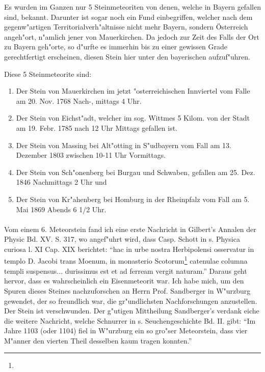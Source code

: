 \documentclass[a4paper, 11pt, oneside]{article}
\begin{document}
Es wurden im Ganzen nur 5 Steinmeteoriten von denen, welche in Bayern gefallen sind, bekannt. Darunter ist sogar noch ein Fund einbegriffen, welcher nach dem gegenw"artigen Territorialverh"altnisse nicht mehr Bayern, sondern Österreich angeh"ort, n"amlich jener von Mauerkirchen. Da jedoch zur Zeit des Falls der Ort zu Bayern geh"orte, so d"urfte es immerhin bis zu einer gewissen Grade gerechtfertigt erscheinen, diesen Stein hier unter den bayerischen aufzuf"uhren.

Diese 5 Steinmeteorite sind:
\begin{enumerate}
    \item Der Stein von Mauerkirchen im jetzt "osterreichischen Innviertel vom Falle am 20. Nov. 1768 Nach-, mittags 4 Uhr.
    \item Der Stein von Eichst"adt, welcher im sog. Wittmes 5 Kilom. von der Stadt am 19. Febr. 1785 nach 12 Uhr Mittags gefallen ist.
    \item Der Stein von Massing bei Alt"otting in S"udbayern vom Fall am 13. Dezember 1803 zwischen 10-11 Uhr Vormittags.
    \item Der Stein von Sch"onenberg bei Burgau und Schwaben, gefallen am 25. Dez. 1846 Nachmittags 2 Uhr und
    \item Der Stein von Kr"ahenberg bei Homburg in der Rheinpfalz vom Fall am 5. Mai 1869 Abends 6 1/2 Uhr.
\end{enumerate}
\paragraph{}
Vom einem 6. Meteorstein fand ich eine erste Nachricht in Gilbert's Annalen der Physic Bd. XV. S. 317, wo angef"uhrt wird, dass Casp. Schott in s. Physica curiosa l. XI Cap. XIX berichtet: "`hac in urbe nostra Herbipolensi osservatur in templo D. Jacobi trans Moenum, in monasterio Scotorum\footnote{} catenulae columna templi suspensus... durissimus est et ad ferream vergit naturam."' Daraus geht hervor, dass es wahrscheinlich ein Eisenmeteorit war. Ich habe mich, um den Spuren dieses Steines nachzuforschen an Herrn Prof. Sandberger in W"urzburg gewendet, der so freundlich war, die gr"undlichsten Nachforschungen anzustellen. Der Stein ist verschwunden. Der g"utigen Mittheilung Sandberger's verdank eiche die weitere Nachricht, welche Schnurrer in s. Seuchengeschichte Bd. II. gibt: "`Im Jahre 1103 (oder 1104) fiel in W"urzburg ein so gro"ser Meteorstein, dass vier M"anner den vierten Theil desselben kaum tragen konnten."'
\clearpage
\end{document}
